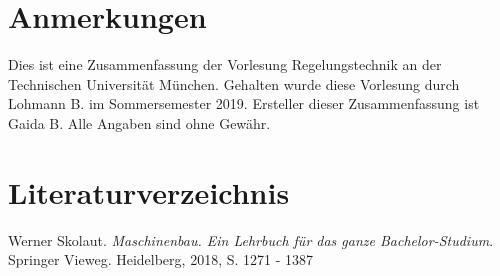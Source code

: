 \documentclass[10pt,a4paper]{article}
\begin{document}





\pagebreak
\section*{Anmerkungen}
Dies ist eine Zusammenfassung der Vorlesung Regelungstechnik an der Technischen Universität München.
Gehalten wurde diese Vorlesung durch Lohmann B. im Sommersemester 2019.
Ersteller dieser Zusammenfassung ist Gaida B.
Alle Angaben sind ohne Gewähr.


\section*{Literaturverzeichnis}
Werner Skolaut. \textit{Maschinenbau. Ein Lehrbuch für das ganze Bachelor-Studium}. Springer Vieweg. Heidelberg, 2018, S. 1271 - 1387
\end{document}
